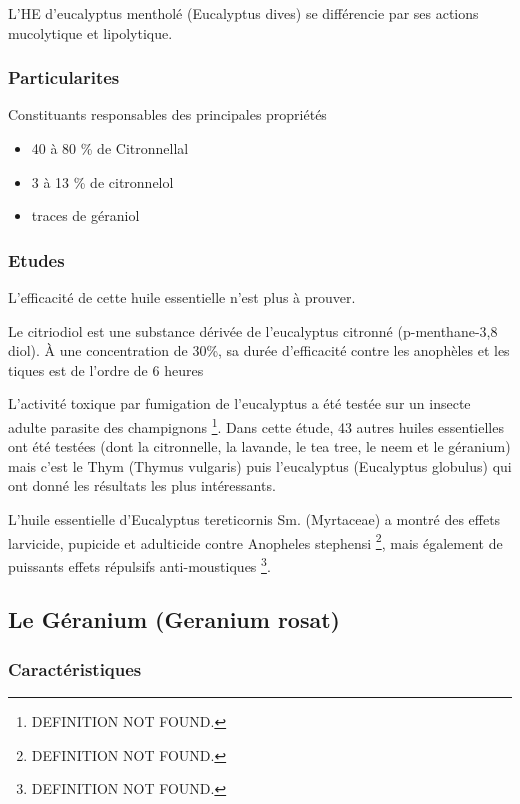 \documentclass[12pt,a4wide]{article}
\begin{document}
L'HE d'eucalyptus mentholé (Eucalyptus dives) se différencie par ses actions mucolytique et lipolytique.


\subsubsection{Particularites}
\label{sec-4-6-3}

Constituants responsables des principales propriétés
\begin{itemize}
\item 40 à 80 \% de Citronnellal
\item 3 à 13 \% de citronnelol
\item traces de géraniol
\end{itemize}

\subsubsection{Etudes}
\label{sec-4-6-4}

L'efficacité de cette huile essentielle n'est plus à prouver.

Le citriodiol est une substance dérivée de l'eucalyptus citronné (p-menthane-3,8
diol). À une concentration de 30\%, sa durée d'efficacité contre les anophèles et
les tiques est de l'ordre de 6 heures \cite{Trigg1996,Caroll2006}

L'activité toxique  par fumigation de l'eucalyptus  a été testée sur  un insecte
adulte  parasite  des champignons  \footnote{DEFINITION NOT FOUND.}.  Dans  cette  étude, 43  autres  huiles
essentielles ont été  testées (dont la citronnelle, la lavande,  le tea tree, le
neem et  le géranium)  mais c'est  le Thym  (Thymus vulgaris)  puis l'eucalyptus
(Eucalyptus globulus) qui ont donné les résultats les plus intéressants.

L'huile  essentielle d'Eucalyptus  tereticornis  Sm.  (Myrtaceae)  a montré  des
effets larvicide, pupicide  et adulticide contre Anopheles  stephensi \footnote{DEFINITION NOT FOUND.}, mais
également de puissants effets répulsifs anti-moustiques \footnote{DEFINITION NOT FOUND.}.



\subsection{Le Géranium (Geranium rosat)}
\label{sec-4-7}
\subsubsection{Caractéristiques}
\label{sec-4-7-1}
\end{document}
